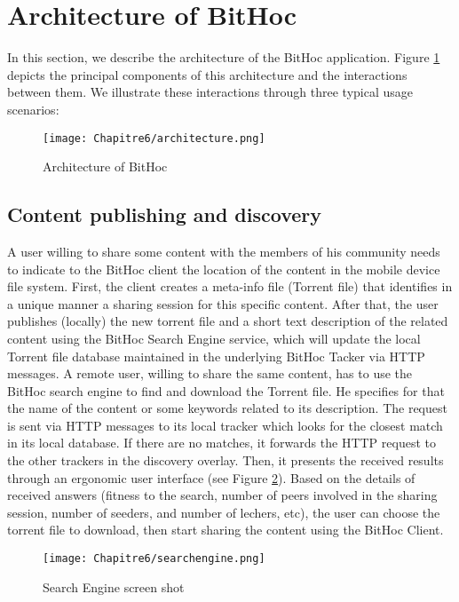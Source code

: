 \section{Architecture of BitHoc}
\label{secarchitecture}
In this section, we describe the architecture of the BitHoc application. Figure \ref{figarch} depicts the principal components of this architecture and the interactions between them. We illustrate these interactions through three typical usage scenarios:
\begin{figure}[!htbp]
  \begin{center}
    \texttt{[image: Chapitre6/architecture.png]}
  \end{center}
  \caption{Architecture of BitHoc}
  \label{figarch}
\end{figure}

\subsection{Content publishing and discovery}
A user willing to share some content with the members of his community needs to indicate to the BitHoc client the location of the content in the mobile device file system. First, the client creates a meta-info file (Torrent file) that identifies in a unique manner a sharing session for this specific content. After that, the user publishes (locally) the new torrent file and a short text description of the related content using the BitHoc Search Engine service, which will update the local Torrent file database maintained in the underlying BitHoc Tacker via HTTP messages. A remote user, willing to share the same content, has to use the BitHoc search engine to find and download the Torrent file. He specifies for that the name of the content or some keywords related to its description. The request is sent via HTTP messages to its local tracker which looks for the closest match in its local database. If there are no matches, it forwards the HTTP request to the other trackers in the discovery overlay. Then, it presents the received results through an ergonomic user interface (see Figure \ref{Figsearchengine}). Based on the details of received answers (fitness to the search, number of peers involved in the sharing session, number of seeders, and number of lechers, etc), the user can choose the torrent file to download, then start sharing the content using the BitHoc Client.

\begin{figure}[!htbp]
  \begin{center}
    \texttt{[image: Chapitre6/searchengine.png]}
  \end{center}
  \caption{Search Engine screen shot}
  \label{Figsearchengine}
\end{figure}

